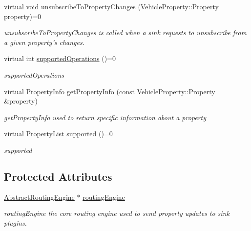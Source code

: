 \begin{DoxyCompactItemize}
virtual void \hyperlink{classAbstractSource_a584372310f191b1b9067a634b7366023}{unsubscribe\-To\-Property\-Changes} (Vehicle\-Property\-::\-Property property)=0
\begin{DoxyCompactList}\small\item\em unsubscribe\-To\-Property\-Changes is called when a sink requests to unsubscribe from a given property's changes. \end{DoxyCompactList}\item 
virtual int \hyperlink{classAbstractSource_a317861675652372a72fc01c075036b51}{supported\-Operations} ()=0
\begin{DoxyCompactList}\small\item\em supported\-Operations \end{DoxyCompactList}\item 
virtual \hyperlink{classPropertyInfo}{Property\-Info} \hyperlink{classAbstractSource_a43e73a1071714f919ff31ae8077a7719}{get\-Property\-Info} (const Vehicle\-Property\-::\-Property \&property)
\begin{DoxyCompactList}\small\item\em get\-Property\-Info used to return specific information about a property \end{DoxyCompactList}\item 
virtual Property\-List \hyperlink{classAbstractSource_ad8330cbbac84dc24851eb50ff7243460}{supported} ()=0
\begin{DoxyCompactList}\small\item\em supported \end{DoxyCompactList}\end{DoxyCompactItemize}
\subsection*{Protected Attributes}
\begin{DoxyCompactItemize}
\item 
\hyperlink{classAbstractRoutingEngine}{Abstract\-Routing\-Engine} $\ast$ \hyperlink{classAbstractSource_aabbce93fea123c54be55a007c928a6f1}{routing\-Engine}
\begin{DoxyCompactList}\small\item\em routing\-Engine the core routing engine used to send property updates to sink plugins. \end{DoxyCompactList}\end{DoxyCompactItemize}


